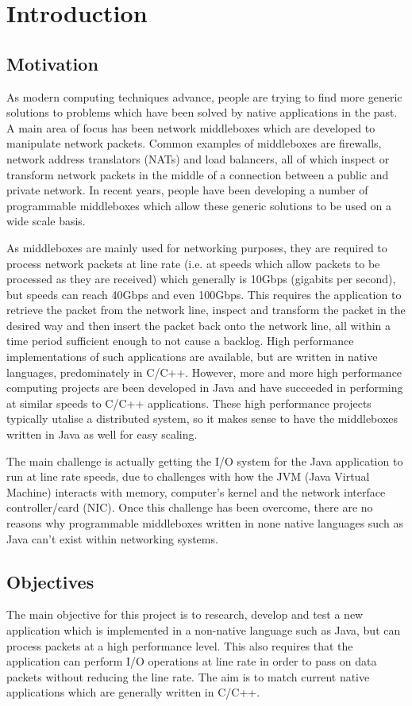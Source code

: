 \documentclass[final_report.tex]{subfiles}
\begin{document}
\section{Introduction}

\subsection{Motivation}
As modern computing techniques advance, people are trying to find more generic solutions to problems which have been solved by native applications in the past. A main area of focus has been network middleboxes which are developed to manipulate network packets. Common examples of middleboxes are firewalls, network address translators (NATs) and load balancers, all of which inspect or transform network packets in the middle of a connection between a public and private network. In recent years, people have been developing a number of programmable middleboxes which allow these generic solutions to be used on a wide scale basis.

As middleboxes are mainly used for networking purposes, they are required to process network packets at line rate (i.e. at speeds which allow packets to be processed as they are received) which generally is 10Gbps (gigabits per second), but speeds can reach 40Gbps and even 100Gbps. This requires the application to retrieve the packet from the network line, inspect and transform the packet in the desired way and then insert the packet back onto the network line, all within a time period sufficient enough to not cause a backlog. High performance implementations of such applications are available, but are written in native languages, predominately in C/C++. However, more and more high performance computing projects are been developed in Java and have succeeded in performing at similar speeds to C/C++ applications. These high performance projects typically utalise a distributed system, so it makes sense to have the middleboxes written in Java as well for easy scaling.

The main challenge is actually getting the I/O system for the Java application to run at line rate speeds, due to challenges with how the JVM (Java Virtual Machine) interacts with memory, computer's kernel and the network interface controller/card (NIC). Once this challenge has been overcome, there are no reasons why programmable middleboxes written in none native languages such as Java can't exist within networking systems.

\subsection{Objectives}
The main objective for this project is to research, develop and test a new application which is implemented in a non-native language such as Java, but can process packets at a high performance level. This also requires that the application can perform I/O operations at line rate in order to pass on data packets without reducing the line rate. The aim is to match current native applications which are generally written in C/C++.
\end{document}
